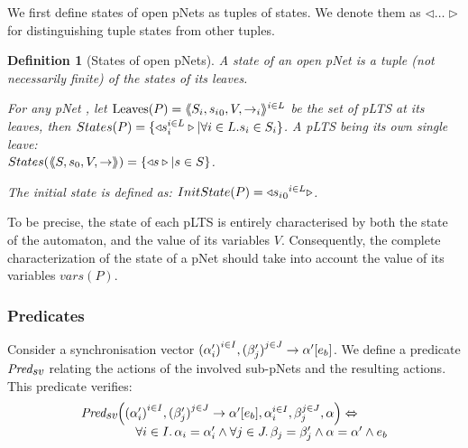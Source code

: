 \documentclass{lmcs}
\newcommand{\LUDO}[1]{\textcolor{darkgreen}{#1}}
\newtheorem{definition}{Definition}
\newtheorem{example}{Example}
\begin{document}
We first define states of open pNets as tuples of states. We denote them
 as $\triangleleft\ldots\triangleright$ for distinguishing tuple 
states from other tuples.
\begin{definition}[States of open pNets]\label{def-states}
  A state of an open pNet is a tuple (not necessarily finite) of the
  states of its leaves.

  For any pNet \pNet, let $\operatorname{Leaves}(P) = \langle\hspace{-0.58ex}\langle S_i,{s_i}_0,V, \to_i\rangle\hspace{-0.58ex}\rangle^{i \in L}$ be 
  the set of pLTS at its leaves,
  then $States(P) = \{\triangleleft s_i^{i\in L}
  \triangleright| \forall i\in L. s_i \in S_i\}$.
A pLTS being its own single leave:\\
  $States(\langle\hspace{-0.58ex}\langle S,s_0,V, \to\rangle\hspace{-0.58ex}\rangle) = \{\triangleleft s \triangleright| s \in S \}$.  

The initial state is defined as:
$InitState(P) = \triangleleft {{s_i}_0}^{i\in L}  \triangleright$.
\end{definition}
To be precise, the state of each pLTS is entirely characterised by both the state of the automaton, and the value of its variables $V$. Consequently, the complete characterization of the state of a pNet should take into account the value of its variables $vars(P)$.



\subsubsection*{Predicates} 
Consider a synchronisation vector ${(\alpha'_i)}^{i\in I}, {(\beta'_j)}^{j\in J}\to \alpha' [e_b]$. We 
define a
predicate $\Predsv$ relating
the actions of the involved sub-pNets and the resulting actions. This predicate verifies:
\[\begin{array}{l}\Predsv \Big(\SV{{(\alpha'_i)}^{i\in I}, {(\beta'_j)}^{j\in J}} 
{\alpha'} 
{e_b}, \alpha_i^{i\in I}, \beta_j^{j\in J}, \alpha\Big)\Leftrightarrow \\~\qquad\qquad%
%
\forall i\in I.\, \alpha_i=\alpha'_i\land \forall j \in J.\, \beta_j=\beta'_j \land 
\alpha=\alpha' 
\land e_b
\end{array} 
\]
\end{document}
